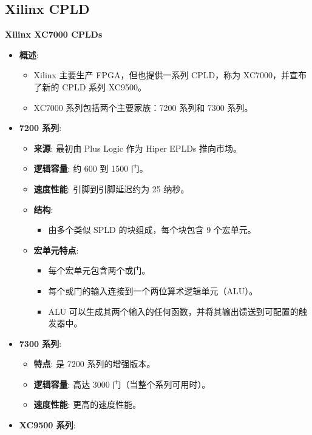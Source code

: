 \subsection{Xilinx CPLD}
\begin{frame}[allowframebreaks]{\textbf{Xilinx XC7000 CPLDs}}
\label{xilinx-xc7000-cplds}
\begin{itemize}
\tightlist
\item
    \textbf{概述}:

    \begin{itemize}
    \tightlist
    \item
    Xilinx 主要生产 FPGA，但也提供一系列 CPLD，称为 XC7000，并宣布了新的
    CPLD 系列 XC9500。
    \item
    XC7000 系列包括两个主要家族：7200 系列和 7300 系列。
    \end{itemize}
\item
    \textbf{7200 系列}:

    \begin{itemize}
    \tightlist
    \item
    \textbf{来源}: 最初由 Plus Logic 作为 Hiper EPLDs 推向市场。
    \item
    \textbf{逻辑容量}: 约 600 到 1500 门。
    \item
    \textbf{速度性能}: 引脚到引脚延迟约为 25 纳秒。
    \item
    \textbf{结构}:

    \begin{itemize}
    \tightlist
    \item
        由多个类似 SPLD 的块组成，每个块包含 9 个宏单元。
    \end{itemize}
    \item
    \textbf{宏单元特点}:

    \begin{itemize}
    \tightlist
    \item
        每个宏单元包含两个或门。
    \item
        每个或门的输入连接到一个两位算术逻辑单元（ALU）。
    \item
        ALU
        可以生成其两个输入的任何函数，并将其输出馈送到可配置的触发器中。
    \end{itemize}
    \end{itemize}
\item
    \textbf{7300 系列}:

    \begin{itemize}
    \tightlist
    \item
    \textbf{特点}: 是 7200 系列的增强版本。
    \item
    \textbf{逻辑容量}: 高达 3000 门（当整个系列可用时）。
    \item
    \textbf{速度性能}: 更高的速度性能。
    \end{itemize}
\item
    \textbf{XC9500 系列}:


\end{itemize}
\end{frame}
